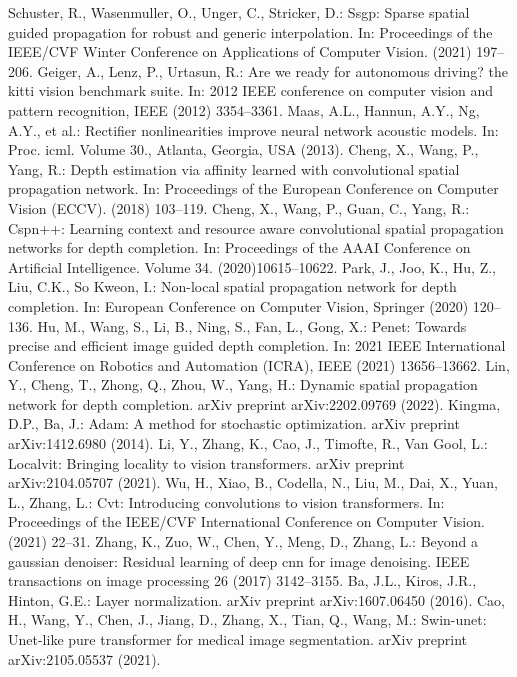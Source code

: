 \documentclass[conference]{IEEEtran}
\begin{document}
\begin{thebibliography}{00}
 Schuster, R., Wasenmuller, O., Unger, C., Stricker, D.: Ssgp: Sparse spatial guided propagation for robust and generic interpolation. In: Proceedings of the IEEE/CVF Winter Conference on Applications of Computer Vision. (2021) 197–206.
Geiger, A., Lenz, P., Urtasun, R.: Are we ready for autonomous driving? the kitti vision benchmark suite. In: 2012 IEEE conference on computer vision and pattern recognition, IEEE (2012) 3354–3361.
 Maas, A.L., Hannun, A.Y., Ng, A.Y., et al.: Rectifier nonlinearities improve neural network acoustic models. In: Proc. icml. Volume 30., Atlanta, Georgia, USA (2013).
 Cheng, X., Wang, P., Yang, R.: Depth estimation via affinity learned with convolutional spatial propagation network. In: Proceedings of the European Conference on Computer Vision (ECCV). (2018) 103–119.
 Cheng, X., Wang, P., Guan, C., Yang, R.: Cspn++: Learning context and resource aware convolutional spatial propagation networks for depth completion. In: Proceedings of the AAAI Conference on Artificial Intelligence. Volume 34. (2020)10615–10622.
 Park, J., Joo, K., Hu, Z., Liu, C.K., So Kweon, I.: Non-local spatial propagation network for depth completion. In: European Conference on Computer Vision, Springer (2020) 120–136.
 Hu, M., Wang, S., Li, B., Ning, S., Fan, L., Gong, X.: Penet: Towards precise and efficient image guided depth completion. In: 2021 IEEE International Conference on Robotics and Automation (ICRA), IEEE (2021) 13656–13662.
 Lin, Y., Cheng, T., Zhong, Q., Zhou, W., Yang, H.: Dynamic spatial propagation network for depth completion. arXiv preprint arXiv:2202.09769 (2022).
 Kingma, D.P., Ba, J.: Adam: A method for stochastic optimization. arXiv preprint arXiv:1412.6980 (2014).
 Li, Y., Zhang, K., Cao, J., Timofte, R., Van Gool, L.: Localvit: Bringing locality
to vision transformers. arXiv preprint arXiv:2104.05707 (2021).
 Wu, H., Xiao, B., Codella, N., Liu, M., Dai, X., Yuan, L., Zhang, L.: Cvt: Introducing convolutions to vision transformers. In: Proceedings of the IEEE/CVF International Conference on Computer Vision. (2021) 22–31.
 Zhang, K., Zuo, W., Chen, Y., Meng, D., Zhang, L.: Beyond a gaussian denoiser: Residual learning of deep cnn for image denoising. IEEE transactions on image processing 26 (2017) 3142–3155.
 Ba, J.L., Kiros, J.R., Hinton, G.E.: Layer normalization. arXiv preprint arXiv:1607.06450 (2016).
 Cao, H., Wang, Y., Chen, J., Jiang, D., Zhang, X., Tian, Q., Wang, M.: Swin-unet: Unet-like pure transformer for medical image segmentation. arXiv preprint arXiv:2105.05537 (2021).

\end{thebibliography}
\end{document}

